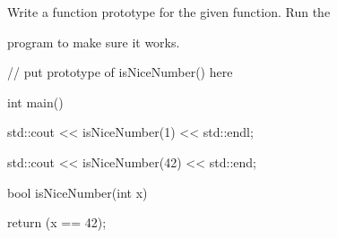Write a function prototype for the given function. Run the

program to make sure it works.



\begin{consolethree}[escapeinside=||]

// put prototype of isNiceNumber() here



int main()

{

    std::cout << isNiceNumber(1) << std::endl;

    std::cout << isNiceNumber(42) << std::end;

}



bool isNiceNumber(int x)

{

    return (x == 42);

}

\end{consolethree}

